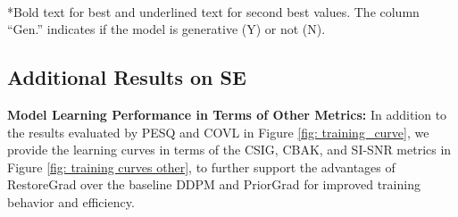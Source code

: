 \begin{table}[!t]
\centering
\begin{small}
\setlength{\tabcolsep}{5pt} %
\caption{Evaluation of SE models on CHiME-3 test set, where the models were trained on VoiceBank+DEMAND training set.}
\vspace{0.2cm}
\label{table: se sota comp ood}
\\
\vspace{0.1cm}
\scriptsize
*Bold text for best and underlined text for second best values. The column ``Gen.'' indicates if the model is generative (Y) or not (N).
\end{small}
\end{table}

\subsection{Additional Results on SE}
\label{sec: additional results se}

\noindent\textbf{Model Learning Performance in Terms of Other Metrics:}
In addition to the results evaluated by PESQ and COVL in Figure \ref{fig: training_curve}, we provide the learning curves in terms of the CSIG, CBAK, and SI-SNR metrics in Figure \ref{fig: training curves other}, to further support the advantages of RestoreGrad over the baseline DDPM and PriorGrad for improved training behavior and efficiency.

